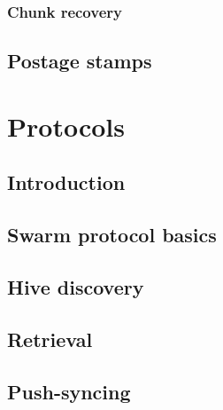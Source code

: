 \subsection{Chunk recovery  \statusyellow}\label{spec:format:recovery}


\section{Postage stamps \statusorange}\label{spec:format:postage-stamps}

%


\chapter{Protocols}\label{spec:protocol}

\section{Introduction \statusorange}\label{spec:protocol:intro}


\section{Swarm protocol basics\statusgreen}\label{spec:protocol:basics}


\section{Hive discovery  \statusgreen}\label{spec:protocol:hive}


\section{Retrieval  \statusorange}\label{spec:protocol:retrieval}


\section{Push-syncing  \statusorange}\label{spec:protocol:push-sync}



